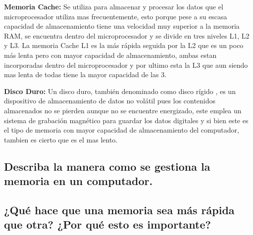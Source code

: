 \documentclass{article}
\begin{document}
\vspace{0.5cm}

\textbf{Memoria Cache:} Se utiliza para almacenar y procesar los datos que el microprocesador utiliza mas frecuentemente, esto porque pese a su escasa capacidad de almacenamiento tiene una velocidad muy superior a la memoria RAM, se encuentra dentro del microprocesador y se divide en tres niveles L1, L2 y L3. La memoria Cache L1 es la más rápida seguida por la L2 que es un poco más lenta pero con mayor capacidad de almacenamiento, ambas estan incorporadas dentro del microprocesador y por ultimo esta la L3 que aun siendo mas lenta de todas tiene la mayor capacidad de las 3.

\vspace{0.5cm}

\textbf{Disco Duro:} Un disco duro, también denominado como disco rígido , es un dispositivo de almacenamiento de datos no volátil pues los contenidos almacenados no se pierden aunque no se encuentre energizado, este emplea un sistema de grabación magnético para guardar los datos digitales y si bien este es el tipo de memoria con mayor capacidad de almacenamiento del computador, tambien es cierto que es el mas lento.

\subsection{Describa la manera como se gestiona la memoria en un computador.}

\subsection{¿Qué hace que una memoria sea más rápida que otra? ¿Por qué esto es importante?}
\end{document}
